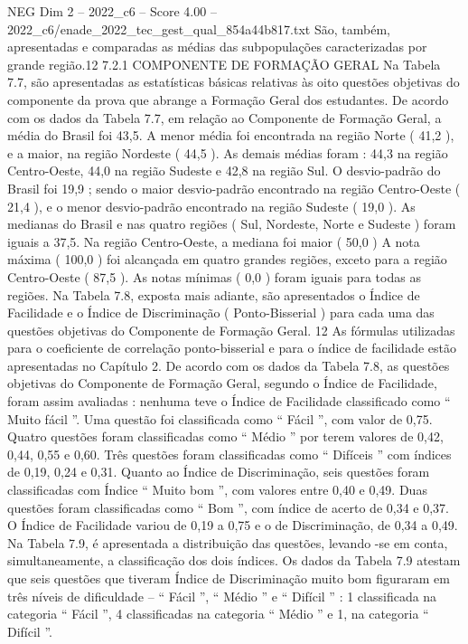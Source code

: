 \begin{textsample}{NEG Dim 2 – 2022\_c6 – Score 4.00 – 2022\_c6/enade\_2022\_tec\_gest\_qual\_854a44b817.txt}
São, também, apresentadas e comparadas as médias das subpopulações caracterizadas por grande região.12 7.2.1 COMPONENTE DE FORMAÇÃO GERAL Na Tabela 7.7, são apresentadas as estatísticas básicas relativas às oito questões objetivas do componente da prova que abrange a Formação Geral dos estudantes.
De acordo com os dados da Tabela 7.7, em relação ao Componente de Formação Geral, a média do Brasil foi 43,5.
A menor média foi encontrada na região Norte ( 41,2 ), e a maior, na região Nordeste ( 44,5 ).
As demais médias foram : 44,3 na região Centro-Oeste, 44,0 na região Sudeste e 42,8 na região Sul.
O desvio-padrão do Brasil foi 19,9 ; sendo o maior desvio-padrão encontrado na região Centro-Oeste ( 21,4 ), e o menor desvio-padrão encontrado na região Sudeste ( 19,0 ).
As medianas do Brasil e nas quatro regiões ( Sul, Nordeste, Norte e Sudeste ) foram iguais a 37,5.
Na região Centro-Oeste, a mediana foi maior ( 50,0 ) A nota máxima ( 100,0 ) foi alcançada em quatro grandes regiões, exceto para a região Centro-Oeste ( 87,5 ).
As notas mínimas ( 0,0 ) foram iguais para todas as regiões.
Na Tabela 7.8, exposta mais adiante, são apresentados o Índice de Facilidade e o Índice de Discriminação ( Ponto-Bisserial ) para cada uma das questões objetivas do Componente de Formação Geral. 12 As fórmulas utilizadas para o coeficiente de correlação ponto-bisserial e para o índice de facilidade estão apresentadas no Capítulo 2.
De acordo com os dados da Tabela 7.8, as questões objetivas do Componente de Formação Geral, segundo o Índice de Facilidade, foram assim avaliadas : nenhuma teve o Índice de Facilidade classificado como “ Muito fácil ”.
Uma questão foi classificada como “ Fácil ”, com valor de 0,75.
Quatro questões foram classificadas como “ Médio ” por terem valores de 0,42, 0,44, 0,55 e 0,60.
Três questões foram classificadas como “ Difíceis ” com índices de 0,19, 0,24 e 0,31.
Quanto ao Índice de Discriminação, seis questões foram classificadas com Índice “ Muito bom ”, com valores entre 0,40 e 0,49.
Duas questões foram classificadas como “ Bom ”, com índice de acerto de 0,34 e 0,37.
O Índice de Facilidade variou de 0,19 a 0,75 e o de Discriminação, de 0,34 a 0,49.
Na Tabela 7.9, é apresentada a distribuição das questões, levando -se em conta, simultaneamente, a classificação dos dois índices.
Os dados da Tabela 7.9 atestam que seis questões que tiveram Índice de Discriminação muito bom figuraram em três níveis de dificuldade – “ Fácil ”, “ Médio ” e “ Difícil ” : 1 classificada na categoria “ Fácil ”, 4 classificadas na categoria “ Médio ” e 1, na categoria “ Difícil ”.

\end{textsample}
